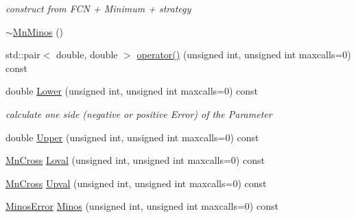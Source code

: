 \begin{DoxyCompactItemize}
\begin{DoxyCompactList}\small\item\em construct from F\+CN + Minimum + strategy \end{DoxyCompactList}\item 
\mbox{\hyperlink{classROOT_1_1Minuit2_1_1MnMinos_a64625d0dd4308a7c8fb8930c980f11bd}{$\sim$\+Mn\+Minos}} ()
\item 
std\+::pair$<$ double, double $>$ \mbox{\hyperlink{classROOT_1_1Minuit2_1_1MnMinos_a82c85ed2e8212675339ffcc2a5bb61cb}{operator()}} (unsigned int, unsigned int maxcalls=0) const
\item 
double \mbox{\hyperlink{classROOT_1_1Minuit2_1_1MnMinos_a0e6c6ab67bdd7b3461d900f64b4908ba}{Lower}} (unsigned int, unsigned int maxcalls=0) const
\begin{DoxyCompactList}\small\item\em calculate one side (negative or positive Error) of the Parameter \end{DoxyCompactList}\item 
double \mbox{\hyperlink{classROOT_1_1Minuit2_1_1MnMinos_a387b76e3135998c519db7e6ae4cc3d90}{Upper}} (unsigned int, unsigned int maxcalls=0) const
\item 
\mbox{\hyperlink{classROOT_1_1Minuit2_1_1MnCross}{Mn\+Cross}} \mbox{\hyperlink{classROOT_1_1Minuit2_1_1MnMinos_a708381f90e4bd9118dec60726a1bdf73}{Loval}} (unsigned int, unsigned int maxcalls=0) const
\item 
\mbox{\hyperlink{classROOT_1_1Minuit2_1_1MnCross}{Mn\+Cross}} \mbox{\hyperlink{classROOT_1_1Minuit2_1_1MnMinos_a6fb073e7f84cb2d038714e362eda732a}{Upval}} (unsigned int, unsigned int maxcalls=0) const
\item 
\mbox{\hyperlink{classROOT_1_1Minuit2_1_1MinosError}{Minos\+Error}} \mbox{\hyperlink{classROOT_1_1Minuit2_1_1MnMinos_aeb1fe39f5851b5af050191d812d21723}{Minos}} (unsigned int, unsigned int maxcalls=0) const
\end{DoxyCompactItemize}
